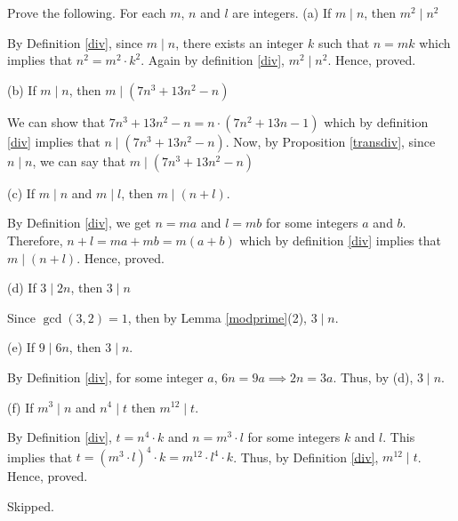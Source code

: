 \begin{problem}
	Prove the following. For each $m$, $n$ and $l$ are integers.
	\bigbreak
	(a) If $m \mid n$, then $m^2 \mid n^2$
	\begin{solution}
		By Definition \ref{div}, since $m \mid n$, there exists an integer $k$ such that $n = mk$ which implies that $n^2 = m^2 \cdot k^2$.
		Again by definition \ref{div}, $m^2 \mid n^2$. 
		Hence, proved.
	\end{solution}

	(b) If $m \mid n$, then $m \mid (7n^3 + 13n^2 - n)$
	\begin{solution}
		We can show that $7n^3 + 13n^2 - n = n \cdot (7n^2 + 13n - 1)$ which by definition \ref{div} implies that $n \mid (7n^3 + 13n^2 - n)$.
		Now, by Proposition \ref{transdiv}, since $n \mid n$, we can say that $m \mid (7n^3 + 13n^2 - n)$
	\end{solution}

	(c) If $m \mid n$ and $m \mid l$, then $m \mid (n+l)$.
	\begin{solution}
		By Definition \ref{div}, we get $n = ma$ and $l = mb$ for some integers $a$ and $b$.
		Therefore, $n+l = ma + mb = m(a+b)$ which by definition \ref{div} implies that $m \mid (n+l)$. 
		Hence, proved.
	\end{solution}

	(d) If $3 \mid 2n$, then $3 \mid n$
	\begin{solution}
		Since $\gcd(3,2) = 1$, then by Lemma \ref{modprime}(2), $3 \mid n$.
	\end{solution}

	(e) If $9 \mid 6n$, then $3 \mid n$.
	\begin{solution}
		By Definition \ref{div}, for some integer $a$, $6n = 9a \implies 2n = 3a$. Thus, by (d), $3 \mid n$.
	\end{solution}

	(f) If $m^3 \mid n$ and $n^4 \mid t$ then $m^12 \mid t$.
	\begin{solution}
		By Definition \ref{div}, $t = n^4 \cdot k$ and $n = m^3 \cdot l$ for some integers $k$ and $l$. This implies that $t = (m^3 \cdot l)^4 \cdot k = m^12  \cdot l^4 \cdot k$. Thus, by Definition \ref{div}, $m^12 \mid t$. Hence, proved.
	\end{solution}

\end{problem}


\begin{problem}Skipped.\end{problem}

